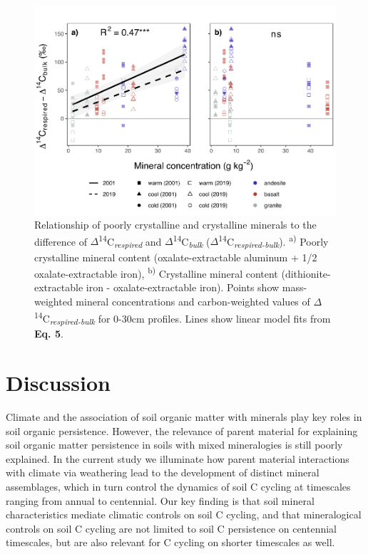 \documentclass[english,man,floatsintext]{apa6}
\begin{document}
\begin{figure}

{\centering \includegraphics{sra-blk-inc-19_files/figure-latex/plot-min-14c-0-30-blk-inc-1} 

}

\caption{Relationship of poorly crystalline and crystalline minerals to the difference of \(\Delta\)\textsuperscript{14}C\textsubscript{\emph{respired}} and \(\Delta\)\textsuperscript{14}C\textsubscript{\emph{bulk}} (\(\Delta\)\textsuperscript{14}C\textsubscript{\emph{respired-bulk}}). \textsuperscript{a)} Poorly crystalline mineral content (oxalate-extractable aluminum + 1/2 oxalate-extractable iron), \textsuperscript{b)} Crystalline mineral content (dithionite-extractable iron - oxalate-extractable iron). Points show mass-weighted mineral concentrations and carbon-weighted values of \(\Delta\)\textsuperscript{14}C\textsubscript{\emph{respired-bulk}} for 0-30cm profiles. Lines show linear model fits from \textbf{Eq. 5}.}\label{fig:plot-min-14c-0-30-blk-inc}
\end{figure}

\hypertarget{discussion}{%
\section{Discussion}\label{discussion}}

Climate and the association of soil organic matter with minerals play key roles in soil organic persistence. However, the relevance of parent material for explaining soil organic matter persistence in soils with mixed mineralogies is still poorly explained. In the current study we illuminate how parent material interactions with climate via weathering lead to the development of distinct mineral assemblages, which in turn control the dynamics of soil C cycling at timescales ranging from annual to centennial. Our key finding is that soil mineral characteristics mediate climatic controls on soil C cycling, and that mineralogical controls on soil C cycling are not limited to soil C persistence on centennial timescales, but are also relevant for C cycling on shorter timescales as well.
\end{document}
